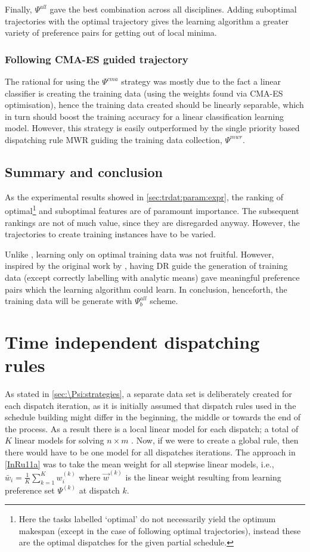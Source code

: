 Finally, $\Psi^{all}$ gave the best combination across all disciplines. Adding 
suboptimal trajectories with the optimal trajectory gives the learning 
algorithm a greater variety of preference pairs for getting out of local minima.

\subsubsection{Following CMA-ES guided trajectory}
The rational for using the $\Psi^{cma}$ strategy was mostly due to the fact a 
linear classifier is creating the training data (using the weights found via 
CMA-ES optimisation), hence the training data created should be linearly 
separable, which in turn should boost the training accuracy for a linear 
classification learning model. However, this strategy is easily outperformed by 
the single priority based dispatching rule MWR guiding the training data 
collection, $\Psi^{mwr}$. 


\subsection{Summary and conclusion}
As the experimental results showed in \cref{sec:trdat:param:expr}, the ranking 
of optimal\footnote{Here the tasks labelled `optimal' do not necessarily yield 
    the optimum makespan (except in the case of following optimal 
    trajectories), 
    instead these are the optimal dispatches for the given partial schedule.} 
    and 
suboptimal features are of paramount importance. The subsequent rankings are 
not of much value, since they are disregarded anyway. However, the trajectories 
to create training instances have to be varied.

Unlike \citep{Siggi10,Malik08,Russell09}, learning only on optimal training 
data was not fruitful. However, inspired by the original work by 
\cite{Siggi05}, having DR guide the generation of training data (except 
correctly labelling with analytic means) gave meaningful preference pairs which 
the learning algorithm could learn. In conclusion, henceforth, the training 
data will be generate with $\Psi_{b}^{all}$ scheme.



\section{Time independent dispatching rules}\label{sec:pref:scalability}
As stated in \cref{sec:\Psi:strategies}, a separate data set is deliberately 
created for each dispatch iteration, as it is initially assumed that dispatch 
rules used in the schedule building might differ in the beginning, the middle 
or towards the end of the process. As a result there is a local linear model 
for each dispatch; a total of $K$ linear models for solving $n\times m$ 
\jsp. Now, if we were to create a global rule, then there would have to be one 
model for all dispatches iterations. The approach in \cref{InRu11a} was to take 
the mean weight for all stepwise linear models, i.e., 
$\bar{w}_i=\frac{1}{K}\sum_{k=1}^K w_i^{(k)}$ where $\vec{w}^{(k)}$ is 
the linear weight resulting from learning preference set $\Psi^{(k)}$ at 
dispatch $k$. 

